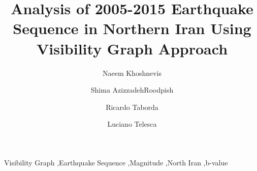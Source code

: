 \documentclass[a4paper,review]{elsarticle}
\begin{document}
\begin{frontmatter}

\title{Analysis of 2005-2015 Earthquake Sequence in Northern Iran Using Visibility Graph Approach}

\author[label1]{Naeem Khoshnevis}
\author[label1,label2]{Shima AzizzadehRoodpish}
\author[label1,label2]{Ricardo Taborda}
\author[label3]{Luciano Telesca}

\address[label1]{Center for Earthquake Research and Information, University of Memphis, 3890 Central Ave., Memphis TN 38152, USA}
\address[label2]{Department of Civil Engineering, University of Memphis, 3890 Central Ave., Memphis TN 38152, USA}
\address[label3]{Institute of Methodologies for Environmental Analysis, National Research Council, Tito, Italy}



\begin{keyword}
Visibility Graph \sep Earthquake Sequence \sep Magnitude \sep North Iran \sep b-value 



\end{keyword}

\end{frontmatter}
















\end{document}
